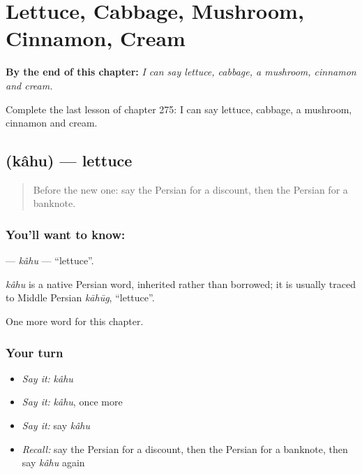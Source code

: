
\chapter{Lettuce, Cabbage, Mushroom, Cinnamon, Cream}
\label{ch:fa-lettuce-cabbage-mushroom-cinnamon-cream}

\begin{chapteropening}
\textbf{By the end of this chapter:} \emph{I can say lettuce, cabbage, a mushroom, cinnamon and cream.}

Complete the last lesson of chapter 275: I can say lettuce, cabbage, a mushroom, cinnamon and cream.
\end{chapteropening}

\section[\texorpdfstring{\fa{کاهو} (kâhu)}{کاهو (kâhu)}]{ (kâhu) — lettuce}

\label{lesson:FA-C275-kahu}



\begin{quote}
Before the new one: say the Persian for a discount, then the Persian for a banknote.
\end{quote}

\subsection*{You'll want to know: }
\textbf{} — \emph{kâhu} — \textquotedblleft{}lettuce\textquotedblright{}.

\begin{cousinweb}
\emph{kâhu} is a native Persian word, inherited rather than borrowed; it is usually traced to Middle Persian \emph{kāhūg}, \textquotedblleft{}lettuce\textquotedblright{}.
\end{cousinweb}

\begin{grammarlens}[title={What you've built}]
One more word for this chapter.
\end{grammarlens}

\subsection*{Your turn}
\begin{itemize}
\raggedright
  \item \emph{Say it:} \emph{kâhu}
  \item \emph{Say it:} \emph{kâhu}, once more
  \item \emph{Say it:} say \emph{kâhu}
  \item \emph{Recall:} say the Persian for a discount, then the Persian for a banknote, then say \emph{kâhu} again
\end{itemize}

